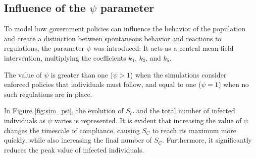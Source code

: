 \subsection{Influence of the $\psi$ parameter}
To model how government policies can influence the behavior of the population and create a distinction between spontaneous behavior and reactions to regulations, the parameter $\psi$ was introduced. It acts as a central mean-field intervention, multiplying the coefficients $k_1$, $k_3$, and $k_5$.

The value of $\psi$ is greater than one ($\psi > 1$) when the simulations consider enforced policies that individuals must follow, and equal to one ($\psi = 1$) when no such regulations are in place.

In Figure \ref{fig:sim_psi}, the evolution of $S_C$ and the total number of infected individuals as $\psi$ varies is represented. It is evident that increasing the value of $\psi$ changes the timescale of compliance, causing $S_C$ to reach its maximum more quickly, while also increasing the final number of $S_C$. Furthermore, it significantly reduces the peak value of infected individuals.

